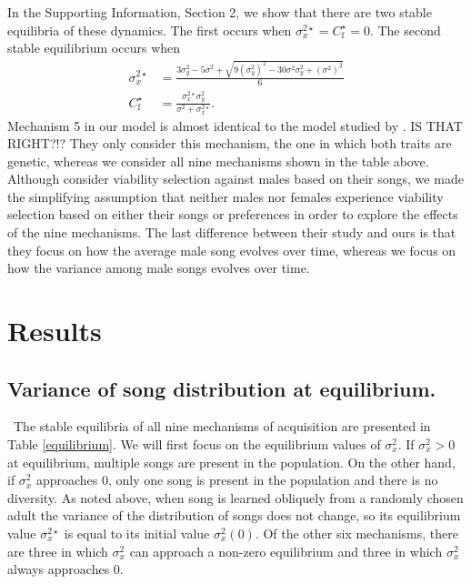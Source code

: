 \documentclass[12pt]{article}
\newcommand{\x}[1]{\text{#1}}
\begin{document}
In the Supporting Information, Section 2, we show that there are two stable equilibria of these dynamics. The first occurs when $\sigma_x^{2\star}=C_\x{f}^\star=0$. The second stable equilibrium occurs when
\begin{align*}
\sigma_x^{2\star}&=\frac{3\sigma_y^2-5\sigma^2+\sqrt{9(\sigma_y^2)^2-30\sigma^2\sigma_y^2+(\sigma^2)^2}}{6}
\\ C_\x{f}^\star&=\frac{\sigma_x^{2\star}\sigma_y^2}{\sigma^2+\sigma_x^{2\star}}.
\end{align*}
Mechanism 5 in our model is almost identical to the model studied by \citet{Aoki:2001ly}. IS THAT RIGHT?!? They only consider this mechanism, the one in which both traits are genetic, whereas we consider all nine mechanisms shown in the table above. Although \citet{Aoki:2001ly} consider viability selection against males based on their songs, we made the simplifying assumption that neither males nor females experience viability selection based on either their songs or preferences in order to explore the effects of the nine mechanisms. The last difference between their study and ours is that they focus on how the average male song evolves over time, whereas we focus on how the variance among male songs evolves over time.

\section*{Results}
\subsection*{Variance of song distribution at equilibrium. }
\ The stable equilibria of all nine mechanisms of acquisition are presented in Table \ref{equilibrium}. We will first focus on the equilibrium values of $\sigma_x^2$. If $\sigma_x^2>0$ at equilibrium, multiple songs are present in the population. On the other hand, if $\sigma_x^2$ approaches $0$, only one song is present in the population and there is no diversity. As noted above, when song is learned obliquely from a randomly chosen adult the variance of the distribution of songs does not change, so its equilibrium value $\sigma_x^{2\star}$ is equal to its initial value $\sigma_x^2(0)$. Of the other six mechanisms, there are three in which $\sigma_x^2$ can approach a non-zero equilibrium and three in which $\sigma_x^2$ always approaches $0$.  
\end{document}

